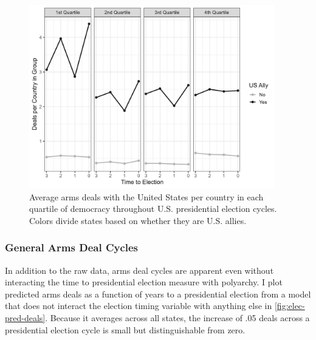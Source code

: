 \documentclass[12pt]{article}
\begin{document}
\begin{figure}[htpb]
	\centering
		\includegraphics[width=0.95\textwidth]{deals-democ-raw.png}
	\caption{Average arms deals with the United States per country in each quartile of democracy throughout U.S. presidential election cycles. Colors divide states based on whether they are U.S. allies.}
	\label{fig:deals-democ-raw}
\end{figure}


\subsubsection{General Arms Deal Cycles}

In addition to the raw data, arms deal cycles are apparent even without interacting the time to presidential election measure with polyarchy.
I plot predicted arms deals as a function of years to a presidential election from a model that does not interact the election timing variable with anything else in \autoref{fig:elec-pred-deals}. 
Because it averages across all states, the increase of .05 deals across a presidential election cycle is small but distinguishable from zero. 
\end{document}
